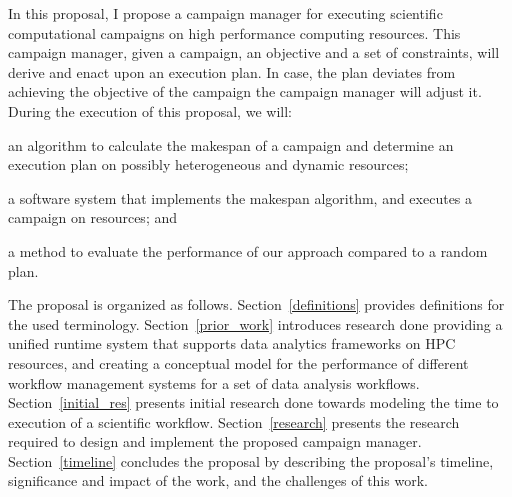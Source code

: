 In this proposal, I propose a campaign manager for executing scientific computational campaigns on high performance computing resources. This campaign manager, given a campaign, an objective and a set of constraints, will derive and enact upon an execution plan. In case, the plan deviates from achieving the objective of the campaign the campaign manager will adjust it. During the execution of this proposal, we 
will:
\begin{inparaenum}[(1)]
\item an algorithm to calculate the makespan of a campaign and determine an execution plan on possibly heterogeneous and dynamic resources;
\item a software system that implements the makespan algorithm, and executes a campaign on resources; and 
\item a method to evaluate the performance of our approach compared to a random plan. 
\end{inparaenum}

The proposal is organized as follows. Section~\ref{definitions} provides definitions for the used terminology. Section~\ref{prior_work} introduces research done providing a unified runtime system that supports data analytics frameworks on HPC resources, and creating a conceptual model for the performance of different workflow management systems for a set of data analysis workflows. Section~\ref{initial_res} presents initial research done towards modeling the time to execution of a scientific workflow. Section~\ref{research} presents the research required to design and implement the proposed campaign manager. Section~\ref{timeline} concludes the proposal by describing the proposal's timeline, significance and impact of the work, and the challenges of this work.
